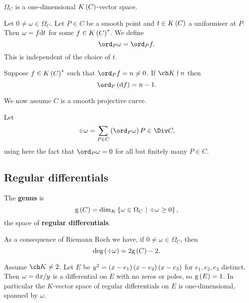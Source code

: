 \begin{fact*}
$ \Omega_C $ is a one-dimensional $ K\br{C} $-vector space.
\end{fact*}

Let $ 0 \ne \omega \in \Omega_C $. Let $ P \in C $ be a smooth point and $ t \in K\br{C} $ a uniformiser at $ P $. Then $ \omega = f\mathrm{d} t $ for some $ f \in K\br{C}^* $. We define
$$ \ord_P \omega = \ord_P f. $$
This is independent of the choice of $ t $.

\begin{fact*}
Suppose $ f \in K\br{C}^* $ such that $ \ord_P f = n \ne 0 $. If $ \ch K \nmid n $ then
$$ \ord_P \br{\d f} = n - 1. $$
\end{fact*}

We now assume $ C $ is a smooth projective curve.

\begin{definition*}
Let
$$ \div \omega = \sum_{P \in C} \br{\ord_P \omega}P \in \Div C, $$
using here the fact that $ \ord_P \omega = 0 $ for all but finitely many $ P \in C $.
\end{definition*}

\subsection{Regular differentials}

\begin{definition*}
The \textbf{genus} is
$$ \g\br{C} = \dim_K \cbr{\omega \in \Omega_C \st \div \omega \ge 0}, $$
the space of \textbf{regular differentials}.
\end{definition*}

As a consequence of Riemann Roch we have, if $ 0 \ne \omega \in \Omega_C $, then
$$ \deg \br{\div \omega} = 2\g\br{C} - 2. $$

\begin{lemma}
Assume $ \ch K \ne 2 $. Let $ E $ be $ y^2 = \br{x - e_1}\br{x - e_2}\br{x - e_3} $ for $ e_1, e_2, e_3 $ distinct. Then $ \omega = \mathrm{d} x / y $ is a differential on $ E $ with no zeros or poles, so $ \g\br{E} = 1 $. In particular the $ K $-vector space of regular differentials on $ E $ is one-dimensional, spanned by $ \omega $.
\end{lemma}

